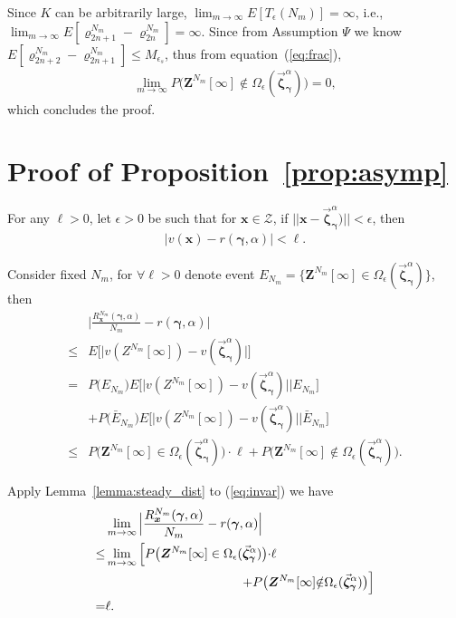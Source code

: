 \documentclass[11pt,twocolumn]{IEEEtran}
\begin{document}
Since $K$ can be arbitrarily large, $\lim_{m \rightarrow \infty} E[T_{\epsilon}(N_m)]=\infty$, i.e., $\lim_{m \rightarrow \infty} E[\varrho^{N_m}_{2n+1}-\varrho^{N_m}_{2n}]=\infty$. Since from Assumption $\Psi$ we know $E[\varrho^{N_m}_{2n+2}-\varrho^{N_m}_{2n+1}]\leq M_{\epsilon_s}$, thus from equation~(\ref{eq:frac}),
\begin{align}
\lim_{m \rightarrow \infty} P\big({\bm Z}^{N_m}[\infty] \notin
\Omega_{\epsilon}(\vec{\bm \zeta}^{\alpha}_{\bm \gamma})\big)=0,
\nonumber
\end{align}
which concludes the proof.

\section{Proof of Proposition~\ref{prop:asymp}}
\label{appen:global}

For any $\ell>0$, let $\epsilon>0$ be such that for $\bm x \in \mathcal{Z}$, if $||\bm x -\bm \vec{\bm \zeta}^{\alpha}_{\bm \gamma}) ||<\epsilon$, then
\begin{align}
|v(\bm x)-r(\bm \gamma, \alpha)|<\ell. \nonumber
\end{align}

Consider fixed $N_m$, for $\forall \ell>0$ denote event $E_{N_m}=\{\bm Z^{N_m}[\infty] \in
\Omega_{\epsilon}(\vec{\bm \zeta}^{\alpha}_{\bm \gamma}) \}$, then
\begin{align}
&\Big | \frac{R^{N_m}_{\bm x}(\bm \gamma, \alpha)}{N_m}- r(\bm \gamma, \alpha)\Big | \nonumber \\
\leq& E\Big[ \big |v(Z^{N_m}[\infty])- v(\vec{\bm \zeta}^{\alpha}_{\bm \gamma})\big |  \Big] \nonumber \\
=& P\big(E_{N_m}\big) E\Big[\big| v(Z^{N_m}[\infty])- v(\vec{\bm \zeta}^{\alpha}_{\bm \gamma}) \big| \Big|  E_{N_m} \Big]\nonumber\\
&+ P\big(\bar{E}_{N_m}\big) E\Big[\big| v(Z^{N_m}[\infty])- v(\vec{\bm \zeta}^{\alpha}_{\bm \gamma}) \big| \Big|  \bar{E}_{N_m} \Big] \nonumber \\
\leq& P\big({\bm Z}^{N_m}[\infty] \in
\Omega_{\epsilon}(\vec{\bm \zeta}^{\alpha}_{\bm \gamma})\big) \cdot \ell + P\big({\bm Z}^{N_m}[\infty] \notin
\Omega_{\epsilon}(\vec{\bm \zeta}^{\alpha}_{\bm \gamma})\big). \label{eq:invar}
\end{align}

Apply Lemma~\ref{lemma:steady_dist} to (\ref{eq:invar}) we have
\begin{align}
&\lim_{m\rightarrow \infty} \Big | \frac{R^{N_m}_{\bm x}(\bm \gamma, \alpha)}{N_m}- r(\bm \gamma, \alpha)\Big |\nonumber\\
\leq& \lim_{m\rightarrow \infty} \Big[P\big({\bm Z}^{N_m}[\infty] \in
\Omega_{\epsilon}(\vec{\bm \zeta}^{\alpha}_{\bm \gamma})\big) {\cdot} \ell\nonumber\\
&\hspace{1.5in}{+} P\big({\bm Z}^{N_m}[\infty]{\notin}
\Omega_{\epsilon}(\vec{\bm \zeta}^{\alpha}_{\bm \gamma})\big)\Big]\nonumber\\
=&\ell. \nonumber
\end{align}
\end{document}
